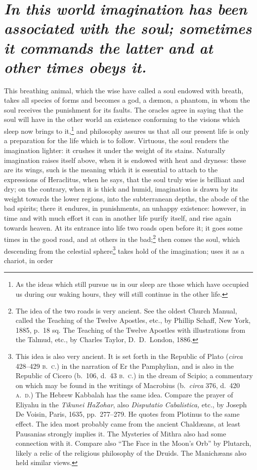 \documentclass[12pt]{article}
\begin{document}
\section{\mdseries\itshape In this world imagination has been associated with
the soul; sometimes it commands the latter and at other times obeys it.}

This breathing animal, which the wise have called a soul endowed with breath,
takes all species of forms and becomes a god, a d{\ae}mon, a phantom, in whom
the soul receives the punishment for its faults. The oracles agree in saying
that the soul will have in the other world an existence conforming to the
visions which sleep now brings to it,\footnote{As the ideas which still pursue
us in our sleep are those which have occupied us during our waking hours, they
will still continue in the other life.} and philosophy assures us that all our
present life is only a preparation for the life which is to follow. Virtuous,
the soul renders the imagination lighter: it crushes it under the weight of its
stains. Naturally imagination raises itself above, when it is endowed with
heat and dryness: these are its wings, such is the meaning which it is
essential to attach to the expressions of Heraclitus, when he says, that the
soul truly wise is brilliant and dry; on the contrary, when it is thick and
humid, imagination is drawn by its weight towards the lower regions, into the
subterranean depths, the abode of the bad spirits; there it endures, in
punishments, an unhappy existence: however, in time and with much effort it can
in another life purify itself, and rise again towards heaven. At its entrance
into life two roads open before it; it goes some times in the good road, and at
others in the bad;\footnote{The idea of the two roads is very ancient. See the
oldest Church Manual, called the Teaching of the Twelve Apostles, etc., by
Phillip Schaff, New York, 1885, p.~18 sq. The Teaching of the Twelve Apostles
with illustrations from the Talmud, etc., by Charles Taylor, D.~D.~London,
1886.} then comes the soul, which descending from the celestial
sphere\footnote{This idea is also very ancient. It is set forth in the Republic
of Plato (\textit{circa} 428--429 \textsc{b.~c.}) in the narration of Er the
Pamphylian, and is also in the Republic of Cicero (b.~106, d.~43
\textsc{b.~c.}) in the dream of Scipio; a commentary on which may be found in
the writings of Macrobius (b.~\textit{circa} 376, d.~420 \textsc{a.~d.}) The
Hebrew Kabbalah has the same idea. Compare the prayer of Eliyahu in the
\textit{Tikunei HaZohar}, also \textit{Disputatio Cabalistica,} etc., by Joseph
De Voisin, Paris, 1635, pp.~277--279. He quotes from Plotinus to the same
effect. The idea most probably came from the ancient Chald{\ae}ans, at least
Pausanias strongly implies it. The Mysteries of Mithra also had some connection
with it. Compare also ``The Face in the Moon's Orb'' by Plutarch, likely a
relic of the religious philosophy of the Druids. The Manich{\ae}ans also held
similar views.} takes hold of the imagination; uses it as a chariot, in order
\end{document}
